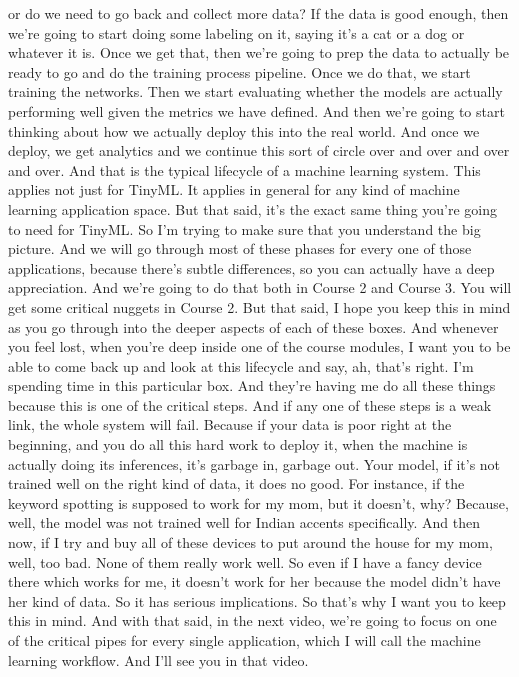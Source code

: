 or do we need to go back and collect more data?
If the data is good enough, then we're going
to start doing some labeling on it, saying it's a cat or a dog
or whatever it is.
Once we get that, then we're going to prep
the data to actually be ready to go and do the training process pipeline.
Once we do that, we start training the networks.
Then we start evaluating whether the models are actually performing
well given the metrics we have defined.
And then we're going to start thinking about how we actually
deploy this into the real world.
And once we deploy, we get analytics and we continue this sort of circle
over and over and over and over.
And that is the typical lifecycle of a machine learning system.
This applies not just for TinyML.
It applies in general for any kind of machine learning application space.
But that said, it's the exact same thing you're going to need for TinyML.
So I'm trying to make sure that you understand the big picture.
And we will go through most of these phases
for every one of those applications, because there's subtle differences,
so you can actually have a deep appreciation.
And we're going to do that both in Course 2 and Course 3.
You will get some critical nuggets in Course 2.
But that said, I hope you keep this in mind
as you go through into the deeper aspects of each of these boxes.
And whenever you feel lost, when you're deep inside one of the course modules,
I want you to be able to come back up and look at this lifecycle
and say, ah, that's right.
I'm spending time in this particular box.
And they're having me do all these things because this
is one of the critical steps.
And if any one of these steps is a weak link, the whole system will fail.
Because if your data is poor right at the beginning,
and you do all this hard work to deploy it,
when the machine is actually doing its inferences, it's garbage in,
garbage out.
Your model, if it's not trained well on the right kind of data,
it does no good.
For instance, if the keyword spotting is supposed to work for my mom,
but it doesn't, why?
Because, well, the model was not trained well for Indian accents specifically.
And then now, if I try and buy all of these devices
to put around the house for my mom, well, too bad.
None of them really work well.
So even if I have a fancy device there which works for me,
it doesn't work for her because the model didn't have her kind of data.
So it has serious implications.
So that's why I want you to keep this in mind.
And with that said, in the next video, we're
going to focus on one of the critical pipes
for every single application, which I will
call the machine learning workflow.
And I'll see you in that video.

